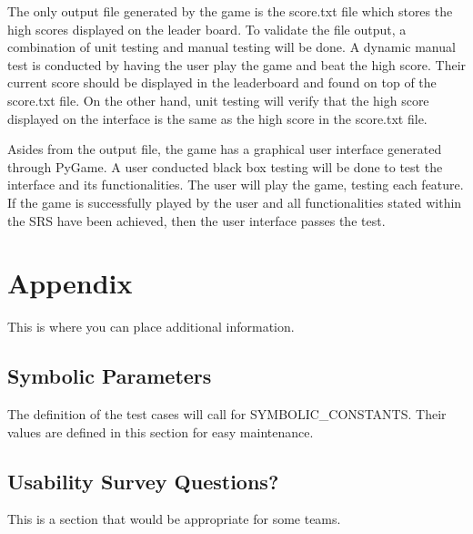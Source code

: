 \documentclass[12pt, titlepage]{article}
\begin{document}
The only output file generated by the game is the score.txt file which stores the high scores displayed on the leader board. To validate the file output, a combination of unit testing and manual testing will be done. A dynamic manual test is conducted by having the user play the game and beat the high score. Their current score should be displayed in the leaderboard and found on top of the score.txt file. On the other hand, unit testing will verify that the high score displayed on the interface is the same as the high score in the score.txt file. 

Asides from the output file, the game has a graphical user interface generated through PyGame. A user conducted black box testing will be done to test the interface and its functionalities. The user will play the game, testing each feature. If the game is successfully played by the user and all functionalities stated within the SRS have been achieved, then the user interface passes the test.






\newpage

\section{Appendix}

This is where you can place additional information.

\subsection{Symbolic Parameters}

The definition of the test cases will call for SYMBOLIC\_CONSTANTS.
Their values are defined in this section for easy maintenance.

\subsection{Usability Survey Questions?}

This is a section that would be appropriate for some teams.
\end{document}
